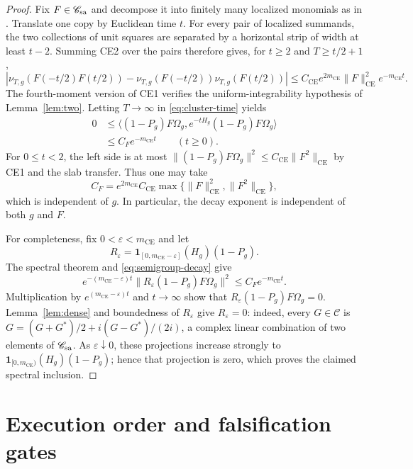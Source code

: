 \documentclass[11pt,a4paper]{article}
\theoremstyle{remark}
\newcommand{\Om}{\Omega}
\newcommand{\CE}{\mathrm{CE}}
\begin{document}
\begin{proof}
Fix $F\in\mathscr C_{\rm sa}$ and decompose it into finitely many localized monomials as
in \cite[(1.1.9)]{GJS}.  Translate one copy by Euclidean time $t$.  For every pair of localized
summands, the two collections of unit squares are separated by a horizontal strip of width at
least $t-2$.  Summing CE2 over the pairs therefore gives, for $t\ge2$ and $T\ge t/2+1$,
\begin{equation}\label{eq:cluster-time}
 |\nu_{T,g}(F(-t/2)F(t/2))-
   \nu_{T,g}(F(-t/2))\nu_{T,g}(F(t/2))|
 \le C_{\CE}e^{2m_{\CE}}\|F\|_{\CE}^2e^{-m_{\CE}t}.                \tag{5.4}
\end{equation}
The fourth-moment version of CE1 verifies the uniform-integrability hypothesis of
Lemma~\ref{lem:two}.  Letting $T\to\infty$ in \eqref{eq:cluster-time} yields
\begin{equation}\label{eq:semigroup-decay}
\begin{aligned}
0&\le
 \langle(1-P_g)F\Om_g,e^{-tH_g}(1-P_g)F\Om_g\rangle\\
 &\le C_Fe^{-m_{\CE}t}\qquad(t\ge0).
\end{aligned}
\tag{5.5}
\end{equation}
For $0\le t<2$, the left side is at most
\(
 \|(1-P_g)F\Om_g\|^2\le C_{\CE}\|F^2\|_{\CE}
\)
by CE1 and the slab transfer.  Thus one may take
\[
 C_F=e^{2m_{\CE}}C_{\CE}
 \max\{\|F\|_{\CE}^2,\|F^2\|_{\CE}\},
\]
which is independent of $g$.  In particular, the decay exponent is independent of both $g$
and $F$.

For completeness, fix $0<\varepsilon<m_{\CE}$ and let
\[
 R_\varepsilon=
 \mathbf1_{[0,m_{\CE}-\varepsilon]}(H_g)(1-P_g).
\]
The spectral theorem and \eqref{eq:semigroup-decay} give
\[
 e^{-(m_{\CE}-\varepsilon)t}\|R_\varepsilon(1-P_g)F\Om_g\|^2
 \le C_Fe^{-m_{\CE}t}.
\]
Multiplication by $e^{(m_{\CE}-\varepsilon)t}$ and $t\to\infty$ show that
$R_\varepsilon(1-P_g)F\Om_g=0$.  Lemma~\ref{lem:dense} and boundedness of
$R_\varepsilon$ give $R_\varepsilon=0$: indeed, every $G\in\mathscr C$ is
$G=(G+G^*)/2+i(G-G^*)/(2i)$, a complex linear combination of two elements of
$\mathscr C_{\rm sa}$.  As $\varepsilon\downarrow0$, these projections increase strongly to
$\mathbf1_{[0,m_{\CE})}(H_g)(1-P_g)$; hence that projection is zero, which proves the claimed
spectral inclusion.
\end{proof}

\section{Execution order and falsification gates}
\end{document}
